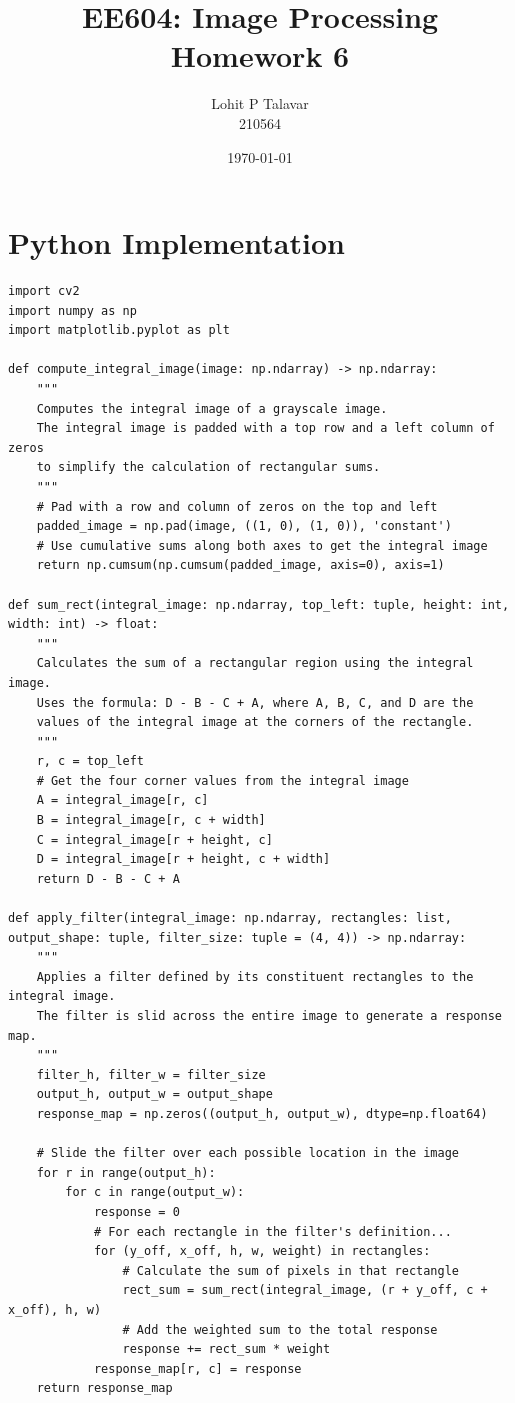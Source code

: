 \documentclass[12pt]{article}
\title{EE604: Image Processing \\ Homework 6}
\author{Lohit P Talavar \\ 210564}
\date{\today}
\begin{document}
\maketitle

\section{Python Implementation}

\begin{lstlisting}[caption={Python code for computing filter responses using the integral image.}, label={lst:code}]
import cv2
import numpy as np
import matplotlib.pyplot as plt

def compute_integral_image(image: np.ndarray) -> np.ndarray:
    """
    Computes the integral image of a grayscale image.
    The integral image is padded with a top row and a left column of zeros
    to simplify the calculation of rectangular sums.
    """
    # Pad with a row and column of zeros on the top and left
    padded_image = np.pad(image, ((1, 0), (1, 0)), 'constant')
    # Use cumulative sums along both axes to get the integral image
    return np.cumsum(np.cumsum(padded_image, axis=0), axis=1)

def sum_rect(integral_image: np.ndarray, top_left: tuple, height: int, width: int) -> float:
    """
    Calculates the sum of a rectangular region using the integral image.
    Uses the formula: D - B - C + A, where A, B, C, and D are the
    values of the integral image at the corners of the rectangle.
    """
    r, c = top_left
    # Get the four corner values from the integral image
    A = integral_image[r, c]
    B = integral_image[r, c + width]
    C = integral_image[r + height, c]
    D = integral_image[r + height, c + width]
    return D - B - C + A

def apply_filter(integral_image: np.ndarray, rectangles: list, output_shape: tuple, filter_size: tuple = (4, 4)) -> np.ndarray:
    """
    Applies a filter defined by its constituent rectangles to the integral image.
    The filter is slid across the entire image to generate a response map.
    """
    filter_h, filter_w = filter_size
    output_h, output_w = output_shape
    response_map = np.zeros((output_h, output_w), dtype=np.float64)

    # Slide the filter over each possible location in the image
    for r in range(output_h):
        for c in range(output_w):
            response = 0
            # For each rectangle in the filter's definition...
            for (y_off, x_off, h, w, weight) in rectangles:
                # Calculate the sum of pixels in that rectangle
                rect_sum = sum_rect(integral_image, (r + y_off, c + x_off), h, w)
                # Add the weighted sum to the total response
                response += rect_sum * weight
            response_map[r, c] = response
    return response_map


\end{lstlisting}
\end{document}
